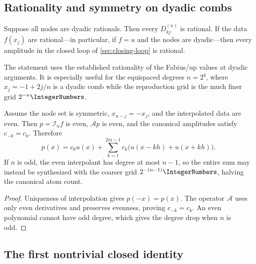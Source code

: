 \documentclass[11pt,oneside]{article}
\numberwithin{equation}{section}
\theoremstyle{definition}
\theoremstyle{remark}
\newcommand{\App}{\mathscr A}
\newcommand{\Lag}{\mathcal I}
\begin{document}
\subsection{Rationality and symmetry on dyadic combs}

\begin{corollary}
\label{cor:rational-loop}
Suppose all nodes are dyadic rationals.  Then every $D_{kj}^{(n)}$ is
rational.  If the data $f(x_j)$ are rational---in particular, if
$f=u$ and the nodes are dyadic---then every amplitude in the closed loop of
\cref{sec:closing-loop} is rational.
\end{corollary}

The statement uses the established rationality of the Fabius/up values at
dyadic arguments.  It is especially useful for the equispaced degrees
$n=2^q$, where $x_j=-1+2j/n$ is a dyadic comb while the reproduction grid is
the much finer grid $2^{-n}\IntegerNumbers$.

\begin{proposition}
\label{prop:symmetry-compression}
Assume the node set is symmetric, $x_{n-j}=-x_j$, and the interpolated data
are even.  Then $p=\Lag_nf$ is even, $\App p$ is even, and the canonical
amplitudes satisfy $c_{-k}=c_k$.  Therefore
\begin{equation}
 p(x)=c_0u(x)+\sum_{k=1}^{2m-1}c_k\bigl(u(x-kh)+u(x+kh)\bigr).
 \label{eq:symmetric-pairs}
\end{equation}
If $n$ is odd, the even interpolant has degree at most $n-1$, so the entire
sum may instead be synthesized with the coarser grid $2^{-(n-1)}\IntegerNumbers$, halving
the canonical atom count.
\end{proposition}

\begin{proof}
Uniqueness of interpolation gives $p(-x)=p(x)$.  The operator $\App$ uses
only even derivatives and preserves evenness, proving $c_{-k}=c_k$.  An even
polynomial cannot have odd degree, which gives the degree drop when $n$ is
odd.
\end{proof}

\subsection{The first nontrivial closed identity}
\end{document}
